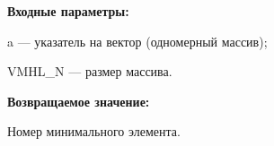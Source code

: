 \textbf{Входные параметры:}

 a --- указатель на вектор (одномерный массив);
 
 VMHL\_N --- размер массива.

\textbf{Возвращаемое значение:}

Номер минимального элемента.
